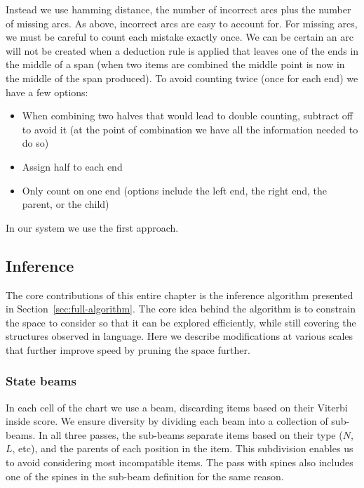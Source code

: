 Instead we use hamming distance, the number of incorrect arcs plus the number of missing arcs.
As above, incorrect arcs are easy to account for.
For missing arcs, we must be careful to count each mistake exactly once.
We can be certain an arc will not be created when a deduction rule is applied that leaves one of the ends in the middle of a span (\myeg when two items are combined the middle point is now in the middle of the span produced).
To avoid counting twice (once for each end) we have a few options:

\begin{itemize}
  \item When combining two halves that would lead to double counting, subtract off to avoid it (at the point of combination we have all the information needed to do so)
  \item Assign half to each end
  \item Only count on one end (options include the left end, the right end, the parent, or the child)
\end{itemize}

In our system we use the first approach.

\subsection{Inference}

The core contributions of this entire chapter is the inference algorithm presented in Section~\ref{sec:full-algorithm}.
The core idea behind the algorithm is to constrain the space to consider so that it can be explored efficiently, while still covering the structures observed in language.
Here we describe modifications at various scales that further improve speed by pruning the space further.

\subsubsection{State beams}

In each cell of the chart we use a beam, discarding items based on their Viterbi inside score.
We ensure diversity by dividing each beam into a collection of sub-beams.
In all three passes, the sub-beams separate items based on their type ($N$, $L$, etc), and the parents of each position in the item.
This subdivision enables us to avoid considering most incompatible items.
The pass with spines also includes one of the spines in the sub-beam definition for the same reason.

